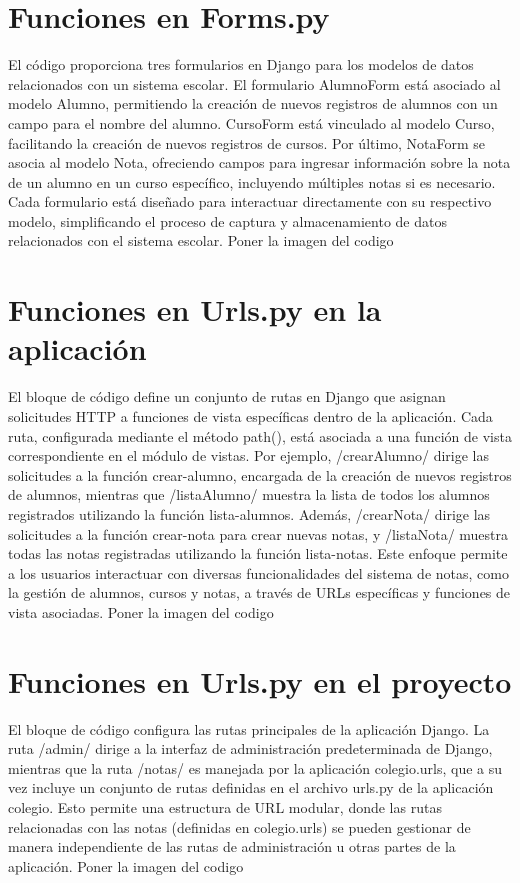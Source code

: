 \documentclass[10pt, a4paper]{article}
\begin{document}
\section{Funciones en Forms.py}
El código proporciona tres formularios en Django para los modelos de datos relacionados con un sistema escolar. El formulario AlumnoForm está asociado al modelo Alumno, permitiendo la creación de nuevos registros de alumnos con un campo para el nombre del alumno. CursoForm está vinculado al modelo Curso, facilitando la creación de nuevos registros de cursos. Por último, NotaForm se asocia al modelo Nota, ofreciendo campos para ingresar información sobre la nota de un alumno en un curso específico, incluyendo múltiples notas si es necesario. Cada formulario está diseñado para interactuar directamente con su respectivo modelo, simplificando el proceso de captura y almacenamiento de datos relacionados con el sistema escolar.
\singlespacing
Poner la imagen del codigo 

\section{Funciones en Urls.py en la aplicación}
El bloque de código define un conjunto de rutas en Django que asignan solicitudes HTTP a funciones de vista específicas dentro de la aplicación. Cada ruta, configurada mediante el método path(), está asociada a una función de vista correspondiente en el módulo de vistas. Por ejemplo, /crearAlumno/ dirige las solicitudes a la función crear-alumno, encargada de la creación de nuevos registros de alumnos, mientras que /listaAlumno/ muestra la lista de todos los alumnos registrados utilizando la función lista-alumnos. Además, /crearNota/ dirige las solicitudes a la función crear-nota para crear nuevas notas, y /listaNota/ muestra todas las notas registradas utilizando la función lista-notas. Este enfoque permite a los usuarios interactuar con diversas funcionalidades del sistema de notas, como la gestión de alumnos, cursos y notas, a través de URLs específicas y funciones de vista asociadas.
\singlespacing
Poner la imagen del codigo 

\section{Funciones en Urls.py en el proyecto}
El bloque de código configura las rutas principales de la aplicación Django. La ruta /admin/ dirige a la interfaz de administración predeterminada de Django, mientras que la ruta /notas/ es manejada por la aplicación colegio.urls, que a su vez incluye un conjunto de rutas definidas en el archivo urls.py de la aplicación colegio. Esto permite una estructura de URL modular, donde las rutas relacionadas con las notas (definidas en colegio.urls) se pueden gestionar de manera independiente de las rutas de administración u otras partes de la aplicación.
\singlespacing
Poner la imagen del codigo 
\end{document}

